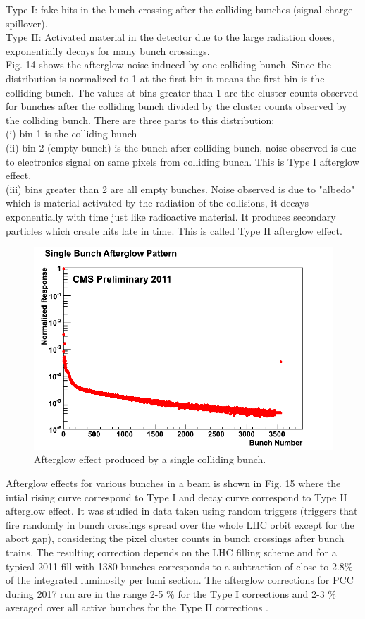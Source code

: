 Type I: fake hits in the bunch crossing after the colliding bunches (signal charge spillover).\\

Type II: Activated material in the detector due to the large radiation doses, exponentially decays for many bunch crossings.\\

Fig. 14 shows the afterglow noise induced by one colliding bunch. Since the distribution is normalized to 1 at the first bin it means the first bin is the colliding bunch. The values at bins greater than 1 are the cluster counts observed for bunches after the colliding bunch divided by the cluster counts observed by the colliding bunch. There are three parts to this distribution: \\

(i) bin 1 is the colliding bunch \\

(ii) bin 2 (empty bunch) is the bunch after colliding bunch, noise observed is due to electronics signal on same pixels from colliding bunch. This is Type I afterglow effect. \\

(iii) bins greater than 2 are all empty bunches. Noise observed is due to "albedo" which is material activated by the radiation of the collisions, it decays exponentially with time just like radioactive material. It produces secondary particles which create hits late in time. This is called Type II afterglow effect. \\

\begin{figure}[H]
  \centering
  \includegraphics[width=0.6\columnwidth]{./SingleBunchAfterglow.png}
  \caption{Afterglow effect produced by a single colliding bunch.}
  \label{fig:LHC}
\end{figure}

 Afterglow effects for various bunches in a beam is shown in Fig. 15 where the intial rising curve correspond to Type I and decay curve correspond to Type II afterglow effect. It was studied in data taken using random triggers (triggers that fire randomly in bunch crossings spread over the whole LHC orbit except for the abort gap), considering the pixel cluster counts in bunch crossings after bunch trains. The resulting correction depends on the LHC filling scheme and for a typical 2011 fill with 1380 bunches corresponds to a subtraction of close to 2.8$\%$ of the integrated luminosity per lumi section. The afterglow corrections for PCC during 2017 run are in the range 2-5 $\%$ for the Type I corrections and 2-3 $\%$ averaged over all active bunches for the Type II corrections \cite{Sirunyan:2759951}.



